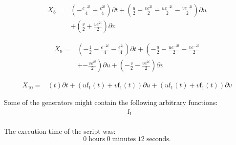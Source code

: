 \begin{align*}
X_{8}=&\left(- \frac{e^{- 2 t}}{4}+\frac{e^{2 t}}{4} \right)\partial t+\left(\frac{u}{2}+\frac{v e^{2 t}}{2}- \frac{u e^{- 2 t}}{2}- \frac{v e^{- 2 t}}{2} \right)\partial u\\
&+\left(\frac{v}{2}+\frac{v e^{2 t}}{2} \right)\partial v
\end{align*}

\begin{align*}
X_{9}=&\left(- \frac{1}{2}- \frac{e^{- 2 t}}{4}- \frac{e^{2 t}}{4} \right)\partial t+\left(- \frac{u}{2}- \frac{u e^{- 2 t}}{2}- \frac{v e^{- 2 t}}{2}\right.\\
&+\left.- \frac{v e^{2 t}}{2} \right)\partial u+\left(- \frac{v}{2}- \frac{v e^{2 t}}{2} \right)\partial v
\end{align*}

\begin{align*}
X_{10}=&\left(t \right)\partial t+\left(u \operatorname{f_{1}}{\left(t \right)}+v \operatorname{f_{1}}{\left(t \right)} \right)\partial u+\left(u \operatorname{f_{1}}{\left(t \right)}+v \operatorname{f_{1}}{\left(t \right)} \right)\partial v
\end{align*}



\noindent Some of the generators might contain the following arbitrary functions:
\begin{align*}
&\operatorname{f_{1}}\\
\end{align*}

\noindent The execution time of the script was:
$$0\;\mathrm{hours}\;0\;\mathrm{minutes}\;12 \;\mathrm{seconds}.$$
